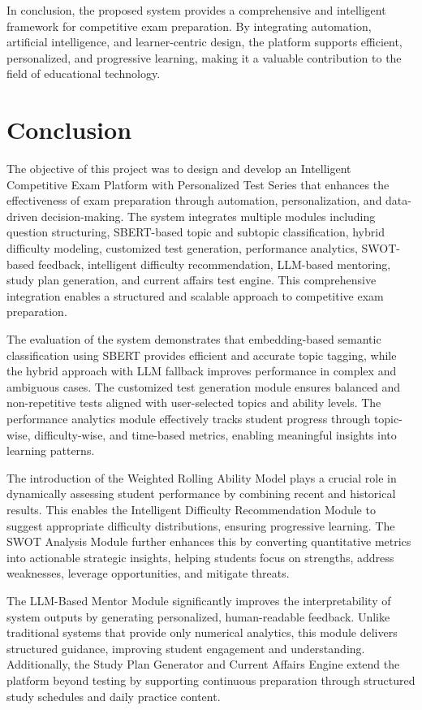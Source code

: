 \begin{sloppypar}
In conclusion, the proposed system provides a comprehensive and intelligent framework for competitive exam preparation. By integrating automation, artificial intelligence, and learner-centric design, the platform supports efficient, personalized, and progressive learning, making it a valuable contribution to the field of educational technology.

\section{Conclusion}

The objective of this project was to design and develop an Intelligent Competitive Exam Platform with Personalized Test Series that enhances the effectiveness of exam preparation through automation, personalization, and data-driven decision-making. The system integrates multiple modules including question structuring, SBERT-based topic and subtopic classification, hybrid difficulty modeling, customized test generation, performance analytics, SWOT-based feedback, intelligent difficulty recommendation, LLM-based mentoring, study plan generation, and current affairs test engine. This comprehensive integration enables a structured and scalable approach to competitive exam preparation.

The evaluation of the system demonstrates that embedding-based semantic classification using SBERT provides efficient and accurate topic tagging, while the hybrid approach with LLM fallback improves performance in complex and ambiguous cases. The customized test generation module ensures balanced and non-repetitive tests aligned with user-selected topics and ability levels. The performance analytics module effectively tracks student progress through topic-wise, difficulty-wise, and time-based metrics, enabling meaningful insights into learning patterns.

The introduction of the Weighted Rolling Ability Model plays a crucial role in dynamically assessing student performance by combining recent and historical results. This enables the Intelligent Difficulty Recommendation Module to suggest appropriate difficulty distributions, ensuring progressive learning. The SWOT Analysis Module further enhances this by converting quantitative metrics into actionable strategic insights, helping students focus on strengths, address weaknesses, leverage opportunities, and mitigate threats.

The LLM-Based Mentor Module significantly improves the interpretability of system outputs by generating personalized, human-readable feedback. Unlike traditional systems that provide only numerical analytics, this module delivers structured guidance, improving student engagement and understanding. Additionally, the Study Plan Generator and Current Affairs Engine extend the platform beyond testing by supporting continuous preparation through structured study schedules and daily practice content.


\end{sloppypar}
